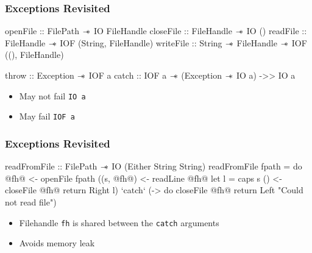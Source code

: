 \begin{frame}[fragile, c]
  \frametitle{Exceptions Revisited}
  \begin{center}
    \begin{haskell}
          openFile :: FilePath $\mathrel{-\mkern-6mu*}$ IO FileHandle
          closeFile :: FileHandle $\mathrel{-\mkern-6mu*}$ IO ()
          readFile :: FileHandle $\mathrel{-\mkern-6mu*}$ IOF (String, FileHandle)
          writeFile :: String $\mathrel{-\mkern-6mu*}$ FileHandle $\mathrel{-\mkern-6mu*}$ IOF ((), FileHandle)

          throw :: Exception $\mathrel{-\mkern-6mu*}$ IOF a
          catch :: IOF a $\mathrel{-\mkern-6mu*}$ (Exception $\mathrel{-\mkern-6mu*}$ IO a) ->> IO a
          \end{haskell}
\begin{itemize}
\item May not fail \texttt{IO a}
\item May fail \texttt{IOF a}
\end{itemize}
\end{center}
\end{frame}

\begin{frame}[fragile, c]
  \frametitle{Exceptions Revisited}
  \begin{center}
    \begin{haskell}
               readFromFile :: FilePath $\mathrel{-\mkern-6mu*}$ IO (Either String String)
               readFromFile fpath =
               do @fh@  <- openFile fpath
                  ((s, @fh@)  <- readLine @fh@
                  let l = caps s
                  () <- closeFile @fh@
                  return \dollar Right l) `catch`
                          (\e -> do closeFile @fh@
                          return \dollar Left "Could not read file")
                        \end{haskell}
                      \end{center}
     \begin{itemize}
     \item Filehandle \texttt{fh} is shared between the \texttt{catch} arguments
\item Avoids memory leak
\end{itemize}
\end{frame}


